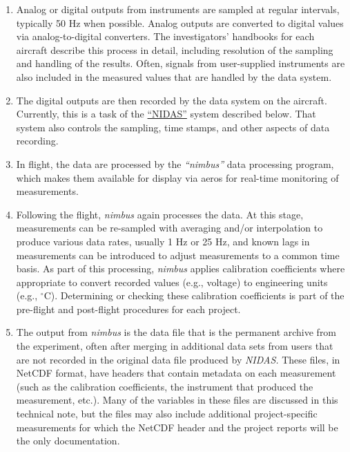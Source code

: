 \documentclass[
]{book}
\providecommand{\tightlist}{%
  \setlength{\itemsep}{0pt}\setlength{\parskip}{0pt}}
\begin{document}
\begin{enumerate}
\def\labelenumi{\arabic{enumi}.}
\tightlist
\item
  Analog or digital outputs from instruments are sampled at regular intervals, typically 50 Hz when possible. Analog outputs are converted to digital values via analog-to-digital converters. The investigators' handbooks for each aircraft describe this process in detail, including resolution of the sampling and handling of the results. Often, signals from user-supplied instruments are also included in the measured values that are handled by the data system.\\
\item
  The digital outputs are then recorded by the data system on the aircraft. Currently, this is a task of the \href{http://www.eol.ucar.edu/data/software/nidas}{``NIDAS''} system described below. That system also controls the sampling, time stamps, and other aspects of data recording.\\
\item
  In flight, the data are processed by the \emph{``nimbus''} data processing program, which makes them available for display via aeros for real-time monitoring of measurements.\\
\item
  Following the flight, \emph{nimbus} again processes the data. At this stage, measurements can be re-sampled with averaging and/or interpolation to produce various data rates, usually 1 Hz or 25 Hz, and known lags in measurements can be introduced to adjust measurements to a common time basis. As part of this processing, \emph{nimbus} applies calibration coefficients where appropriate to convert recorded values (e.g., voltage) to engineering units (e.g., \(^\circ\)C). Determining or checking these calibration coefficients is part of the pre-flight and post-flight procedures for each project.\\
\item
  The output from \emph{nimbus} is the data file that is the permanent archive from the experiment, often after merging in additional data sets from users that are not recorded in the original data file produced by \emph{NIDAS.} These files, in NetCDF format, have headers that contain metadata on each measurement (such as the calibration coefficients, the instrument that produced the measurement, etc.). Many of the variables in these files are discussed in this technical note, but the files may also include additional project-specific measurements for which the NetCDF header and the project reports will be the only documentation.
\end{enumerate}
\end{document}
